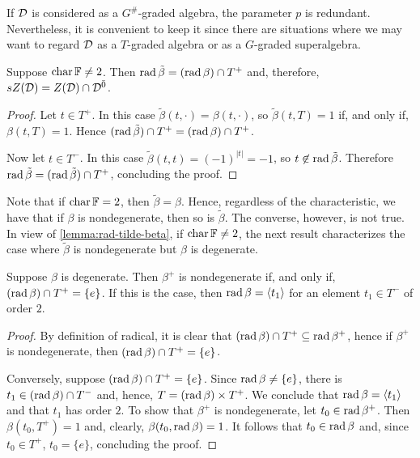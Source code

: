 \begin{remark}
    If $\mathcal{D}$ is considered as a $G^\#$-graded algebra, the parameter $p$ is redundant. 
    Nevertheless, it is convenient to keep it since there are situations where we may want to regard $\mathcal{D}$ as a $T$-graded algebra or as a $G$-graded superalgebra.
\end{remark}

\begin{lemma}\label{lemma:rad-tilde-beta}
	Suppose $\operatorname{char} \mathbb{F} \neq 2$. 
	Then $\operatorname{rad} \tilde\beta = (\operatorname{rad} \beta)\cap T^+$ and, therefore, $sZ(\mathcal{D}) = Z(\mathcal{D})\cap \mathcal{D}^{\bar0}$.
\end{lemma}

\begin{proof}
	Let $t\in T^+$.
	In this case $\tilde\beta (t, \cdot) = \beta (t, \cdot)$, so
	$\tilde\beta (t, T) = 1$ if, and only if, $\beta (t, T) = 1$.
	Hence $(\operatorname{rad} \tilde\beta)\cap T^+ = (\operatorname{rad} \beta)\cap T^+$.

	Now let $t \in T^-$.
	In this case $\tilde \beta (t,t) = (-1)^{|t|} = -1$, so $t \not\in \operatorname{rad} \tilde\beta$.
	Therefore $\operatorname{rad} \tilde\beta = (\operatorname{rad} \tilde\beta)\cap T^+$, concluding the proof.
\end{proof}

Note that if $\operatorname{char} \mathbb{F} = 2$, then $\tilde\beta = \beta$. 
Hence, regardless of the characteristic, we have that if $\beta$ is nondegenerate, then so is $\tilde\beta$. 
The converse, however, is not true. 
In view of \cref{lemma:rad-tilde-beta}, if $\operatorname{char} \mathbb{F} \neq 2$, the next result characterizes the case where $\tilde\beta$ is nondegenerate but $\beta$ is degenerate. 

\begin{lemma}\label{lemma:beta-deg-beta-tilde-nondeg}
    Suppose $\beta$ is degenerate. 
    Then $\beta^+$ is nondegenerate if, and only if, $(\operatorname{rad} \beta) \cap T^+ = \{e\}$. 
    If this is the case, then $\operatorname{rad} \beta = \langle t_1 \rangle$ for an element $t_1 \in T^-$ of order $2$. 
\end{lemma}

\begin{proof}
    By definition of radical, it is clear that $(\operatorname{rad} \beta) \cap T^+ \subseteq \operatorname{rad} \beta^+$, hence if $\beta^+$ is nondegenerate, then $(\operatorname{rad} \beta) \cap T^+ = \{e\}$. 
    
    Conversely, suppose $(\operatorname{rad} \beta) \cap T^+ = \{e\}$. 
    Since $\operatorname{rad}\beta \neq \{e\}$, there is $t_1 \in (\operatorname{rad} \beta) \cap T^-$ and, hence, $T = (\operatorname{rad}\beta) \times T^+$. 
    We conclude that $\operatorname{rad} \beta = \langle t_1 \rangle$ and that $t_1$ has order $2$. 
    To show that $\beta^+$ is nondegenerate, let $t_0 \in \operatorname{rad} \beta^+$. 
    Then $\beta(t_0, T^+) = 1$ and, clearly, $\beta(t_0, \operatorname{rad} \beta) = 1$. 
    It follows that $t_0 \in \operatorname{rad} \beta$ and, since $t_0 \in T^+$, $t_0 = \{e\}$, concluding the proof. 
\end{proof}

